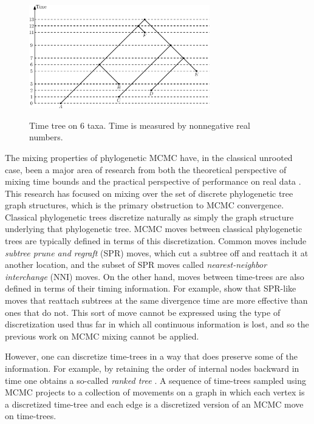 \documentclass{amsart}
\theoremstyle{definition}
\begin{document}
\begin{figure}[ht]
\centering
\includegraphics[width=0.7\textwidth]{timeTree.eps}
\label{timeTree.eps}
\caption{Time tree on $6$ taxa.
Time is measured by nonnegative real numbers.}
\end{figure}

The mixing properties of phylogenetic MCMC have, in the classical unrooted case, been a major area of research from both the theoretical perspective of mixing time bounds \autocite{Mossel2005-ly,Mossel2006-fo,Stefankovic2011-hu,spade2014note} and the practical perspective of performance on real data \autocite{beiko2006searching,Ronquist2006-fv,lakner2008efficiency,Whidden2015-yi}.
This research has focused on mixing over the set of discrete phylogenetic tree graph structures, which is the primary obstruction to MCMC convergence.
Classical phylogenetic trees discretize naturally as simply the graph structure underlying that phylogenetic tree.
MCMC moves between classical phylogenetic trees are typically defined in terms of this discretization.
Common moves include \emph{subtree prune and regraft} (SPR) moves, which cut a subtree off and reattach it at another location, and the subset of SPR moves called \emph{nearest-neighbor interchange} (NNI) moves.
On the other hand, moves between time-trees are also defined in terms of their timing information.
For example, \textcite{Hohna2008-vl} show that SPR-like moves that reattach subtrees at the same divergence time are more effective than ones that do not.
This sort of move cannot be expressed using the type of discretization used thus far in which all continuous information is lost, and so the previous work on MCMC mixing cannot be applied.

However, one can discretize time-trees in a way that does preserve some of the information.
For example, by retaining the order of internal nodes backward in time one obtains a so-called \emph{ranked tree} \autocite{Semple2003-nj}.
A sequence of time-trees sampled using MCMC projects to a collection of movements on a graph in which each vertex is a discretized time-tree and each edge is a discretized version of an MCMC move on time-trees.
\end{document}
